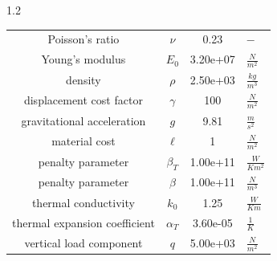 \documentclass[preview]{standalone}
\begin{document}
\begin{spacing}{1.2}
\begin{tabular}{cccl}
\toprule
Poisson's ratio & $\nu$ & 0.23 & $-$ \\ 
Young's modulus & $E_{0}$ & 3.20e+07 & $\frac{N}{m^2}$ \\ 
density & $\rho$ & 2.50e+03 & $\frac{kg}{m^3}$ \\ 
displacement cost factor & $\gamma$ & 100 & $\frac{N}{m^2}$ \\ 
gravitational acceleration & $g$ & 9.81 & $\frac{m}{s^2}$ \\ 
material cost & $\ell$ & 1 & $\frac{N}{m^2}$ \\ 
penalty parameter & $\beta_{T}$ & 1.00e+11 & $\frac{W}{K m^2}$ \\ 
penalty parameter & $\beta$ & 1.00e+11 & $\frac{N}{m^3}$ \\ 
thermal conductivity & $k_{0}$ & 1.25 & $\frac{W}{K m}$ \\ 
thermal expansion coefficient & $\alpha_{T}$ & 3.60e-05 & $\frac{1}{K}$ \\ 
vertical load component & $q$ & 5.00e+03 & $\frac{N}{m^2}$ \\ 
\bottomrule
\end{tabular}
\end{spacing}
\end{document}
